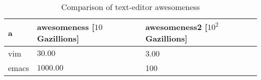 \begin{table}
\centering
\label{tab:awesomeness}
\begin{tabular}{lll}
\toprule
a 	 & awesomeness [$10$ Gazillions] 	 & awesomeness2 [$10^2$ Gazillions] \\
\midrule
vim 	 & $30.00$ 	 & 3.00 \\ 	 %
emacs 	 & $1000.00$ 	 & 100 \\ 	 %
\bottomrule
\end{tabular}
\caption{Comparison of text-editor awesomeness}
\end{table}
